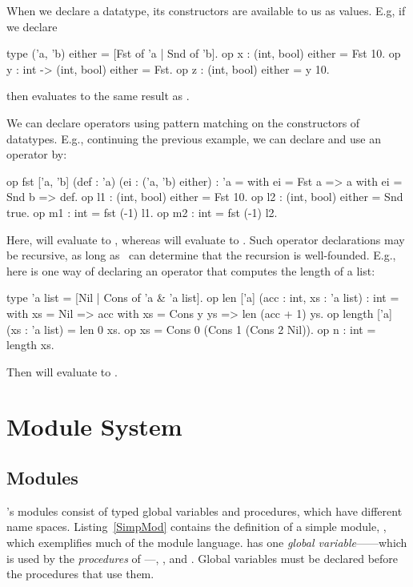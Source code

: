 When we declare a datatype, its constructors are available to
us as values. E.g, if we declare
\begin{easycrypt}{}{}
type ('a, 'b) either = [Fst of 'a | Snd of 'b].
op x : (int, bool) either = Fst 10.
op y : int -> (int, bool) either = Fst.
op z : (int, bool) either = y 10.
\end{easycrypt}
then  evaluates to the same result as .

We can declare operators using pattern matching on the constructors
of datatypes. E.g., continuing the previous example, we can
declare and use an operator  by:
\begin{easycrypt}{}{}
op fst ['a, 'b] (def : 'a) (ei : ('a, 'b) either) : 'a =
  with ei = Fst a => a
  with ei = Snd b => def.
op l1 : (int, bool) either = Fst 10.
op l2 : (int, bool) either = Snd true.
op m1 : int = fst (-1) l1.
op m2 : int = fst (-1) l2.
\end{easycrypt}
Here,  will evaluate to , whereas  will
evaluate to .
Such operator declarations may be recursive, as long as \EasyCrypt\
can determine that the recursion is well-founded. E.g., here is one
way of declaring an operator \ec{length} that computes the length
of a list:
\begin{easycrypt}{}{}
type 'a list = [Nil | Cons of 'a & 'a list].
op len ['a] (acc : int, xs : 'a list) : int =
  with xs = Nil => acc
  with xs = Cons y ys => len (acc + 1) ys.
op length ['a] (xs : 'a list) = len 0 xs.
op xs = Cons 0 (Cons 1 (Cons 2 Nil)).
op n : int = length xs.
\end{easycrypt}
Then  will evaluate to .

\section{Module System}

\subsection{Modules}

\EasyCrypt's modules consist of typed global variables and procedures,
which have different name spaces.
Listing~\ref{SimpMod} contains the definition of a simple module,
\ec{M}, which exemplifies much of the module language.
 has one \emph{global variable}------which is used by the
\emph{procedures} of \ec{M}---\ec{init}, \ec{incr}, \ec{get} and
\ec{main}. Global variables must be declared before the procedures
that use them.


